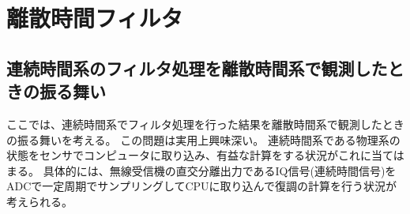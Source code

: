 \chapter{離散時間フィルタ}
    \section{連続時間系のフィルタ処理を離散時間系で観測したときの振る舞い}
        ここでは、連続時間系でフィルタ処理を行った結果を離散時間系で観測したときの振る舞いを考える。
        この問題は実用上興味深い。
        連続時間系である物理系の状態をセンサでコンピュータに取り込み、有益な計算をする状況がこれに当てはまる。
        具体的には、無線受信機の直交分離出力であるIQ信号(連続時間信号)をADCで一定周期でサンプリングしてCPUに取り込んで復調の計算を行う状況が考えられる。
